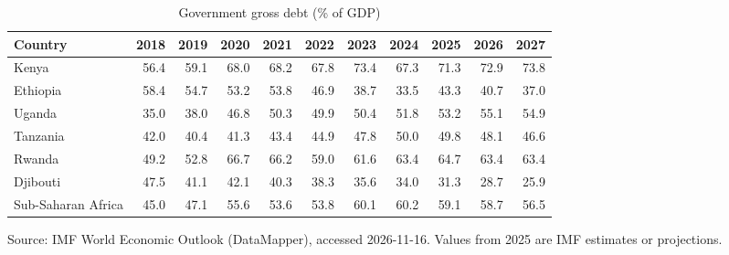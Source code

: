 \begin{table}[htbp]\centering
\caption{Government gross debt (\% of GDP)}
\begin{tabular}{lrrrrrrrrrr}
\toprule
Country & 2018 & 2019 & 2020 & 2021 & 2022 & 2023 & 2024 & 2025 & 2026 & 2027 \\
\midrule
Kenya & 56.4 & 59.1 & 68.0 & 68.2 & 67.8 & 73.4 & 67.3 & 71.3 & 72.9 & 73.8 \\
Ethiopia & 58.4 & 54.7 & 53.2 & 53.8 & 46.9 & 38.7 & 33.5 & 43.3 & 40.7 & 37.0 \\
Uganda & 35.0 & 38.0 & 46.8 & 50.3 & 49.9 & 50.4 & 51.8 & 53.2 & 55.1 & 54.9 \\
Tanzania & 42.0 & 40.4 & 41.3 & 43.4 & 44.9 & 47.8 & 50.0 & 49.8 & 48.1 & 46.6 \\
Rwanda & 49.2 & 52.8 & 66.7 & 66.2 & 59.0 & 61.6 & 63.4 & 64.7 & 63.4 & 63.4 \\
Djibouti & 47.5 & 41.1 & 42.1 & 40.3 & 38.3 & 35.6 & 34.0 & 31.3 & 28.7 & 25.9 \\
Sub-Saharan Africa & 45.0 & 47.1 & 55.6 & 53.6 & 53.8 & 60.1 & 60.2 & 59.1 & 58.7 & 56.5 \\
\bottomrule
\end{tabular}
\par\smallskip\footnotesize Source: IMF World Economic Outlook (DataMapper), accessed 2026-11-16. Values from 2025 are IMF estimates or projections.
\end{table}
